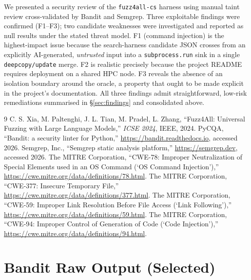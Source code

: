 \documentclass[conference]{IEEEtran}
\begin{document}
We presented a security review of the \texttt{fuzz4all-cs} harness using
manual taint review cross-validated by Bandit and Semgrep. Three
exploitable findings were confirmed (F1--F3); two candidate weaknesses
were investigated and reported as null results under the stated threat
model. F1 (command injection) is the highest-impact issue because the
search-harness candidate JSON crosses from an explicitly AI-generated,
\emph{untrusted} input into a \texttt{subprocess.run} sink in a single
\texttt{deepcopy/update} merge. F2 is realistic precisely because the
project README requires deployment on a shared HPC node. F3 reveals the
absence of an isolation boundary around the oracle, a property that
ought to be made explicit in the project's documentation. All three
findings admit straightforward, low-risk remediations summarised in
\S\ref{sec:findings} and consolidated above.

\begin{thebibliography}{9}
C. S. Xia, M. Paltenghi, J. L. Tian, M. Pradel, L. Zhang,
``Fuzz4All: Universal Fuzzing with Large Language Models,''
\emph{ICSE 2024}, IEEE, 2024.
PyCQA, ``Bandit: a security linter for Python,''
\url{https://bandit.readthedocs.io}, accessed 2026.
Semgrep, Inc., ``Semgrep static analysis platform,''
\url{https://semgrep.dev}, accessed 2026.
The MITRE Corporation, ``CWE-78: Improper Neutralization of Special
Elements used in an OS Command (`OS Command Injection'),''
\url{https://cwe.mitre.org/data/definitions/78.html}.
The MITRE Corporation, ``CWE-377: Insecure Temporary File,''
\url{https://cwe.mitre.org/data/definitions/377.html}.
The MITRE Corporation, ``CWE-59: Improper Link Resolution Before File
Access (`Link Following'),''
\url{https://cwe.mitre.org/data/definitions/59.html}.
The MITRE Corporation, ``CWE-94: Improper Control of Generation of Code
(`Code Injection'),''
\url{https://cwe.mitre.org/data/definitions/94.html}.
\end{thebibliography}

\appendices

\section{Bandit Raw Output (Selected)}
\label{app:bandit}
\end{document}
